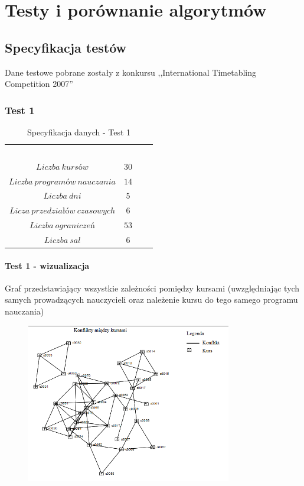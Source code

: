 \chapter{Testy i porównanie algorytmów}
\section{Specyfikacja testów}
Dane testowe pobrane zostały z konkursu ,,International Timetabling Competition 2007''
\subsection{Test 1}
\begin{table}[H]
\begin{center}

\begin{tabular}{ |c|c|c|c| }
\multicolumn{1}{r}{}
 &  \multicolumn{1}{c}{$$}
 & \multicolumn{1}{c}{$$} 
 \\
\cline{1-2}
$Liczba\ kursów$ & $30$\\
\cline{1-2}
$Liczba\ programów\ nauczania$ & $14$\\
\cline{1-2}
$Liczba\ dni$ & $5$ \\
\cline{1-2}
$Licza\ przedziałów\ czasowych$ & $6$ \\
\cline{1-2}
$Liczba\ ograniczeń$ & $53$ \\
\cline{1-2}
$Liczba\ sal$ & $6$ \\
\cline{1-2}
\end{tabular}
\end{center}
\caption {Specyfikacja danych - Test 1}
\end{table}
\subsubsection{Test 1 - wizualizacja}
Graf przedstawiający wszystkie zależności pomiędzy kursami (uwzględniając tych samych prowadzących nauczycieli oraz należenie kursu do tego samego programu nauczania) 

\begin{figure}[h!]
  \caption{}
  \centering
    \includegraphics[width=0.8\textwidth]{test1.PNG}
\end{figure}

